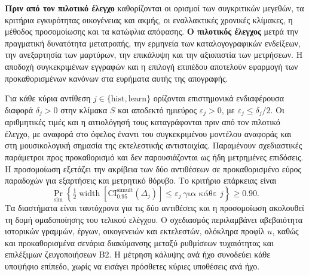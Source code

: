 \documentclass[11pt,a4paper]{article}
\begin{document}
\textbf{Πριν από τον πιλοτικό έλεγχο} καθορίζονται οι ορισμοί των συγκριτικών μεγεθών, τα κριτήρια εγκυρότητας οικογένειας και ακμής, οι εναλλακτικές χρονικές κλίμακες, η μέθοδος προσομοίωσης και τα κατώφλια απόφασης. \textbf{Ο πιλοτικός έλεγχος} μετρά την πραγματική δυνατότητα μετατροπής, την ερμηνεία των καταλογογραφικών ενδείξεων, την ανεξαρτησία των μαρτύρων, την επικάλυψη και την αξιοπιστία των μετρήσεων. Η αποδοχή συγκεκριμένων εγγραφών και η επιλογή επιπέδου αποτελούν εφαρμογή των προκαθορισμένων κανόνων στα ευρήματα αυτής της απογραφής.

Για κάθε κύρια αντίθεση $j\in\{\mathrm{hist},\mathrm{learn}\}$ ορίζονται επιστημονικά ενδιαφέρουσα διαφορά $\delta_j>0$ στην κλίμακα $S$ και αποδεκτό ημιεύρος $\varepsilon_j>0$, με $\varepsilon_j\leq\delta_j/2$. Οι αριθμητικές τιμές και η αιτιολόγησή τους καταγράφονται πριν από τον πιλοτικό έλεγχο, με αναφορά στο όφελος έναντι του συγκεκριμένου μοντέλου αναφοράς και στη μουσικολογική σημασία της εκτελεστικής αντιστοιχίας. Παραμένουν σχεδιαστικές παράμετροι προς προκαθορισμό και δεν παρουσιάζονται ως ήδη μετρημένες επιδόσεις. Η προσομοίωση εξετάζει την ακρίβεια των δύο αντιθέσεων σε προκαθορισμένο εύρος παραδοχών για εξαρτήσεις και μετρητικό θόρυβο. Το κριτήριο επάρκειας είναι
\[
\Pr_{\mathrm{sim}}\!\left\{
\tfrac12\operatorname{width}\!\left[\mathrm{CI}_{0.95}^{\mathrm{simult}}(\Delta_j)\right]
\leq\varepsilon_j\ \text{για κάθε }j
\right\}\geq 0.90.
\]
Τα διαστήματα είναι ταυτόχρονα για τις δύο αντιθέσεις και η προσομοίωση ακολουθεί τη δομή ομαδοποίησης του τελικού ελέγχου. Ο σχεδιασμός περιλαμβάνει αβεβαιότητα ιστορικών γραμμών, έργων, οικογενειών και εκτελεστών, ολόκληρα προφίλ $u$, καθώς και προκαθορισμένα σενάρια διακύμανσης μεταξύ ρυθμίσεων τυχαιότητας και επιλέξιμων ζευγοποιήσεων B2. Η μέτρηση κάλυψης ανά ήχο συνοδεύει κάθε υποψήφιο επίπεδο, χωρίς να εισάγει πρόσθετες κύριες υποθέσεις ανά ήχο.
\end{document}
